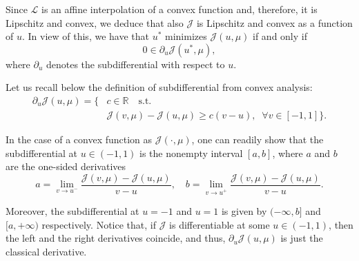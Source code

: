 \documentclass[9pt,shortpaper,twoside,web]{ieeecolor}
\begin{document}
Since $\mathcal{L}$ is an affine interpolation of a convex function and, therefore, it is Lipschitz and convex, we deduce that also $\mathcal{J}$ is Lipschitz and convex as a function of $u$. In view of this, we have that $u^\ast$ minimizes $\mathcal{J} (u,\mu)$ if and only if
\begin{equation}\label{opti cond subdiff}
	0\in \partial_u \mathcal{J} (u^\ast,\mu),
\end{equation}
where $\partial_u$ denotes the subdifferential with respect to $u$. 

Let us recall below the definition of subdifferential from convex analysis:
\begin{align*}
	\partial_u \mathcal{J} (u,\mu) = \{  & c\in \mathbb{R} \quad \text{s.t.} 
	\\
	&\mathcal{J} (v,\mu) - \mathcal{J} (u,\mu) \geq c(v-u),\;\; \forall v\in [-1,1] \}. 
\end{align*}

In the case of a convex function as $\mathcal{J}(\cdot, \mu)$, one can readily show that the subdifferential at $u\in (-1,1)$ is the nonempty interval $[a,b]$, where $a$ and $b$ are the one-sided derivatives
\begin{equation*}
	a = \displaystyle\lim_{v\to u^-} \dfrac{\mathcal{J} (v,\mu) - \mathcal{J}(u,\mu)}{v-u}, \quad b = \displaystyle\lim_{v\to u^+} \dfrac{\mathcal{J} (v,\mu) - \mathcal{J}(u,\mu)}{v-u}. 
\end{equation*}

Moreover, the subdifferential at $u=-1$ and $u=1$ is given by $(-\infty, b]$ and $[a,+\infty)$ respectively.
Notice that, if $\mathcal J$ is differentiable at some $u\in (-1,1)$, then the left and the right derivatives coincide, and thus, $\partial_u \mathcal{J}(u,\mu)$ is just the classical derivative.
\end{document}
